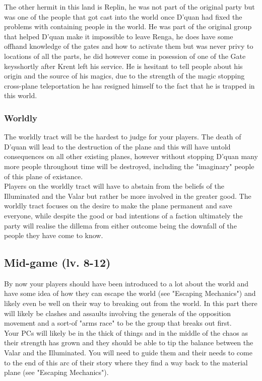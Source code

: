 \documentclass[10pt,twoside,twocolumn]{article}
\begin{document}
The other hermit in this land is Replin, he was not part of the original party but was one of the people that got cast into the world once D'quan had fixed the problems with containing people in the world. He was part of the original group that helped D'quan make it impossible to leave Renga, he does have some offhand knowledge of the gates and how to activate them but was never privy to locations of all the parts, he did however come in posession of one of the Gate keysshortly after Krent left his service. He is hesitant to tell people about his origin and the source of his magics, due to the strength of the magic stopping cross-plane teleportation he has resigned himself to the fact that he is trapped in this world.\\

\subsubsection{Worldly}
The worldly tract will be the hardest to judge for your players. The death of D'quan will lead to the destruction of the plane and this will have untold consequences on all other existing planes, however without stopping D'quan many more people throughout time will be destroyed, including the "imaginary" people of this plane of existance.\\

Players on the worldly tract will have to abstain from the beliefs of the Illuminated and the Valar but rather be more involved in the greater good. The worldly tract focuses on the desire to make the plane permanent and save everyone, while despite the good or bad intentions of a faction ultimately the party will realise the dillema from either outcome being the downfall of the people they have come to know.\\

\subsection{Mid-game (lv. 8-12)}
By now your players should have been introduced to a lot about the world and have some idea of how they can escape the world (see "Escaping Mechanics") and likely even be well on their way to breaking out from the world. In this part there will likely be clashes and assaults involving the generals of the opposition movement and a sort-of "arms race" to be the group that breaks out first.\\

Your PCs will likely be in the thick of things and in the middle of the chaos as their strength has grown and they should be able to tip the balance between the Valar and the Illuminated. You will need to guide them and their needs to come to the end of this arc of their story where they find a way back to the material plane (see "Escaping Mechanics").\\
\end{document}
